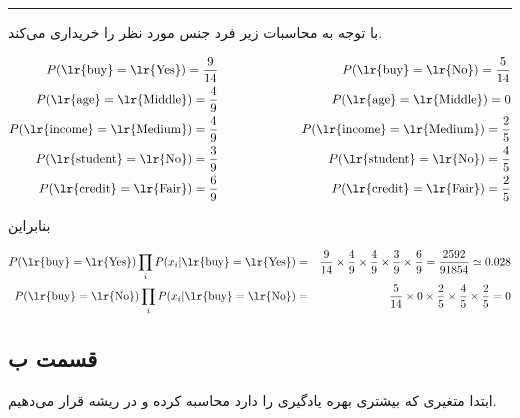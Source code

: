 \documentclass{article}
\begin{document}
\begin{center}
\rule{0.5\linewidth}{0.1pt}
\end{center}

با توجه به محاسبات زیر فرد  جنس مورد نظر را خریداری می‌کند.

\begin{eqnarray*}
    P(\text{\lr{buy}}=\text{\lr{Yes}}) = \frac{9}{14} & \hspace{2cm} & P(\text{\lr{buy}}=\text{\lr{No}}) = \frac{5}{14}\\
    P(\text{\lr{age}}=\text{\lr{Middle}}) = \frac{4}{9} & \hspace{2cm} & P(\text{\lr{age}}=\text{\lr{Middle}}) = 0 \\
    P(\text{\lr{income}}=\text{\lr{Medium}}) = \frac{4}{9} & \hspace{2cm} & P(\text{\lr{income}}=\text{\lr{Medium}}) = \frac{2}{5}\\
    P(\text{\lr{student}}=\text{\lr{No}}) = \frac{3}{9} & \hspace{2cm} & P(\text{\lr{student}}=\text{\lr{No}}) = \frac{4}{5}\\
    P(\text{\lr{credit}}=\text{\lr{Fair}}) = \frac{6}{9} & \hspace{2cm} & P(\text{\lr{credit}}=\text{\lr{Fair}}) = \frac{2}{5}\\
\end{eqnarray*}

بنابراین

\begin{eqnarray*}
    P(\text{\lr{buy}}=\text{\lr{Yes}})\prod_{i} P(x_i|\text{\lr{buy}}=\text{\lr{Yes}}) & = &  \frac{9}{14} \times \frac{4}{9} \times \frac{4}{9} \times \frac{3}{9} \times \frac{6}{9} = \frac{2592}{91854} \simeq 0.028\\
    P(\text{\lr{buy}}=\text{\lr{No}})\prod_{i} P(x_i|\text{\lr{buy}}=\text{\lr{No}})  & = & \frac{5}{14} \times 0 \times \frac{2}{5} \times \frac{4}{5} \times \frac{2}{5} = 0
\end{eqnarray*}

\subsection*{قسمت ب}

ابتدا متغیری که بیشتری بهره یادگیری را دارد محاسبه کرده و در ریشه قرار می‌دهیم.
\end{document}
